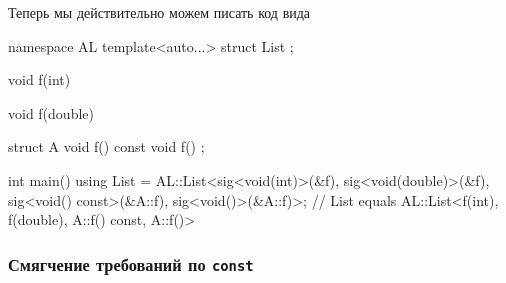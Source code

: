Теперь мы действительно можем писать код вида
\begin{cppcode}
namespace AL {
template<auto...>
struct List {};
}

void f(int) {}

void f(double) {}

struct A {
  void f() const {}
  void f() {}
};

int main() {
  using List = AL::List<sig<void(int)>(&f), sig<void(double)>(&f), 
                        sig<void() const>(&A::f), sig<void()>(&A::f)>;
}
// List equals AL::List<f(int), f(double), A::f() const, A::f()>
\end{cppcode}

\subsubsection{Смягчение требований по \texttt{const}}

